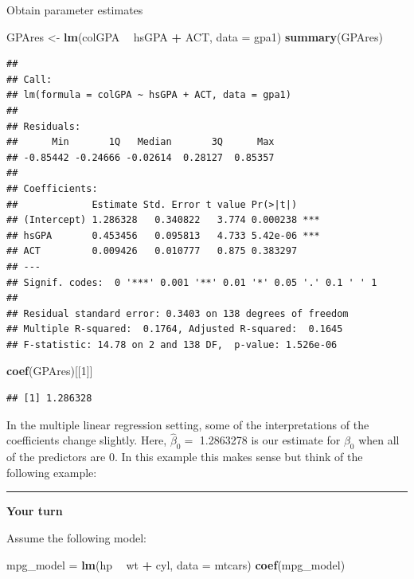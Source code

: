 \documentclass[]{book}
\newenvironment{Shaded}{\begin{snugshade}}{\end{snugshade}}
\newcommand{\DataTypeTok}[1]{\textcolor[rgb]{0.13,0.29,0.53}{#1}}
\newcommand{\DecValTok}[1]{\textcolor[rgb]{0.00,0.00,0.81}{#1}}
\newcommand{\KeywordTok}[1]{\textcolor[rgb]{0.13,0.29,0.53}{\textbf{#1}}}
\newcommand{\NormalTok}[1]{#1}
\newcommand{\OperatorTok}[1]{\textcolor[rgb]{0.81,0.36,0.00}{\textbf{#1}}}
\newcommand{\StringTok}[1]{\textcolor[rgb]{0.31,0.60,0.02}{#1}}
\begin{document}
Obtain parameter estimates

\begin{Shaded}
\begin{Highlighting}[]
\NormalTok{GPAres <-}\StringTok{ }\KeywordTok{lm}\NormalTok{(colGPA }\OperatorTok{~}\StringTok{ }\NormalTok{hsGPA }\OperatorTok{+}\StringTok{ }\NormalTok{ACT, }\DataTypeTok{data =}\NormalTok{ gpa1)}
\KeywordTok{summary}\NormalTok{(GPAres)}
\end{Highlighting}
\end{Shaded}

\begin{verbatim}
## 
## Call:
## lm(formula = colGPA ~ hsGPA + ACT, data = gpa1)
## 
## Residuals:
##      Min       1Q   Median       3Q      Max 
## -0.85442 -0.24666 -0.02614  0.28127  0.85357 
## 
## Coefficients:
##             Estimate Std. Error t value Pr(>|t|)    
## (Intercept) 1.286328   0.340822   3.774 0.000238 ***
## hsGPA       0.453456   0.095813   4.733 5.42e-06 ***
## ACT         0.009426   0.010777   0.875 0.383297    
## ---
## Signif. codes:  0 '***' 0.001 '**' 0.01 '*' 0.05 '.' 0.1 ' ' 1
## 
## Residual standard error: 0.3403 on 138 degrees of freedom
## Multiple R-squared:  0.1764, Adjusted R-squared:  0.1645 
## F-statistic: 14.78 on 2 and 138 DF,  p-value: 1.526e-06
\end{verbatim}

\begin{Shaded}
\begin{Highlighting}[]
\KeywordTok{coef}\NormalTok{(GPAres)[[}\DecValTok{1}\NormalTok{]]}
\end{Highlighting}
\end{Shaded}

\begin{verbatim}
## [1] 1.286328
\end{verbatim}

In the multiple linear regression setting, some of the interpretations
of the coefficients change slightly. Here, \(\hat\beta_{0} =\) 1.2863278
is our estimate for \(\beta_{0}\) when all of the predictors are 0. In
this example this makes sense but think of the following example:

\begin{center}\rule{0.5\linewidth}{\linethickness}\end{center}

\textbf{Your turn}

Assume the following model:

\begin{Shaded}
\begin{Highlighting}[]
\NormalTok{mpg_model =}\StringTok{ }\KeywordTok{lm}\NormalTok{(hp }\OperatorTok{~}\StringTok{ }\NormalTok{wt }\OperatorTok{+}\StringTok{ }\NormalTok{cyl, }\DataTypeTok{data =}\NormalTok{ mtcars)}
\KeywordTok{coef}\NormalTok{(mpg_model)}
\end{Highlighting}
\end{Shaded}
\end{document}
